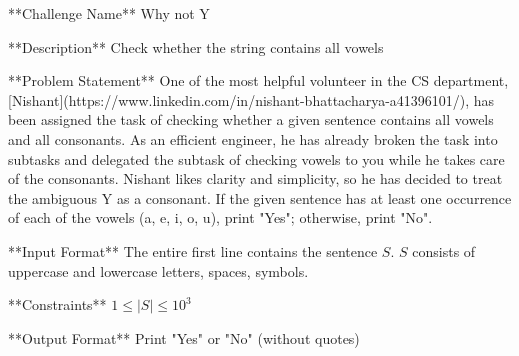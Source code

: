 **Challenge Name**  
Why not Y

**Description**  
Check whether the string contains all vowels

**Problem Statement**  
One of the most helpful volunteer in the CS department, [Nishant](https://www.linkedin.com/in/nishant-bhattacharya-a41396101/), has been assigned the task of checking whether a given sentence contains all vowels and all consonants. As an efficient engineer, he has already broken the task into subtasks and delegated the subtask of checking vowels to you while he takes care of the consonants. Nishant likes clarity and simplicity, so he has decided to treat the ambiguous Y as a consonant. If the given sentence has at least one occurrence of each of the vowels (a, e, i, o, u), print "Yes"; otherwise, print "No".

**Input Format**  
The entire first line contains the sentence $S$.  
$S$ consists of uppercase and lowercase letters, spaces, symbols.

**Constraints**  
$1 \leq |S| \leq 10^3$ 

**Output Format**  
Print "Yes" or "No" (without quotes)